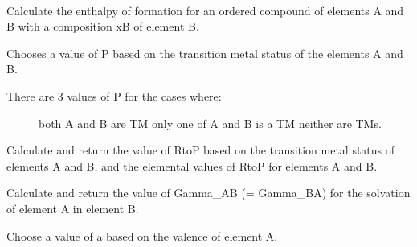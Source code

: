 \documentclass[letterpaper,10pt,english]{sphinxmanual}
\begin{document}

\begin{fulllineitems}
\label{models:qmpy.Miedema}~

\begin{fulllineitems}
\label{models:qmpy.Miedema.H_form_ord}
Calculate the enthalpy of formation for an ordered compound of elements A
and B with a composition xB of element B.

\end{fulllineitems}


\begin{fulllineitems}
\label{models:qmpy.Miedema.P}
Chooses a value of P based on the transition metal status of the elements
A and B.
\begin{description}
\item[{There are 3 values of P for the cases where:}] \leavevmode
both A and B are TM
only one of A and B is a TM
neither are TMs.

\end{description}

\end{fulllineitems}


\begin{fulllineitems}
\label{models:qmpy.Miedema.RtoP}
Calculate and return the value of RtoP based on the transition metal
status of elements A and B, and the elemental values of RtoP for elements A
and B.

\end{fulllineitems}


\begin{fulllineitems}
\label{models:qmpy.Miedema.gamma}
Calculate and return the value of Gamma\_AB (= Gamma\_BA) for the solvation
of element A in element B.

\end{fulllineitems}


\begin{fulllineitems}
\label{models:qmpy.Miedema.pick_a}
Choose a value of a based on the valence of element A.

\end{fulllineitems}


\end{fulllineitems}
\end{document}
